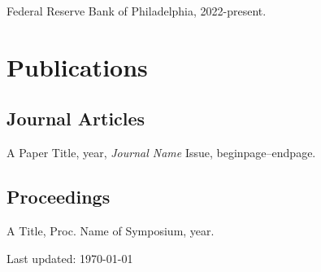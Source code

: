 \documentclass[letterpaper]{article}
\def\footerlink{}
\renewenvironment{itemize}{
	\begin{list}{}{
			\setlength{\leftmargin}{1.5em}
		}
	}{
	\end{list}
}
\begin{document}
	\begin{itemize}
		\item Federal Reserve Bank of Philadelphia, 2022-present.

	\end{itemize}
	
	
	\section*{Publications}
	
	\subsection*{Journal Articles}
	
	\begin{itemize}
		\item A Paper Title, year, {\it Journal
			Name} Issue, beginpage--endpage.
	\end{itemize}
	
	\subsection*{Proceedings}
	
	\begin{itemize}
		\item A Title,
		Proc. Name of Symposium, year.
	\end{itemize}
	
	\bigskip
	
	\begin{center}
		\begin{footnotesize}
			Last updated: \today \\
			\href{\footerlink}{\texttt{\footerlink}}
		\end{footnotesize}
	\end{center}
	
\end{document}
